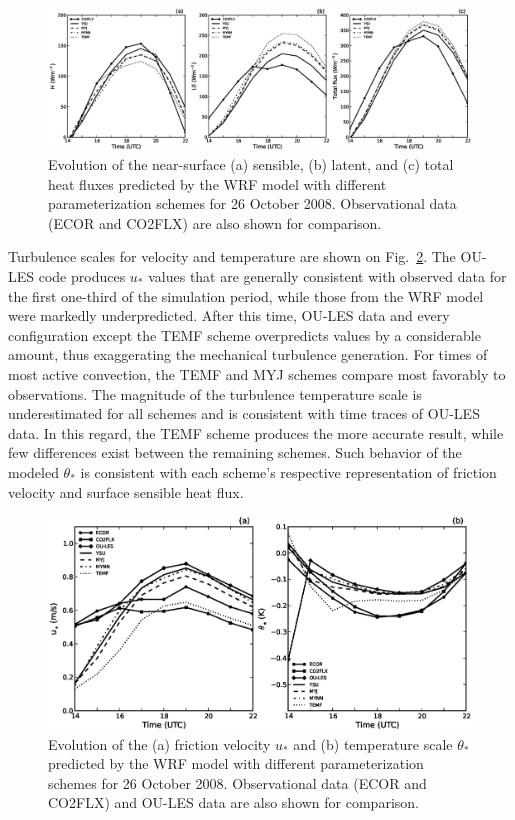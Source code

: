 \begin{figure}[ht!]
\begin{center}
\includegraphics[width=\textwidth]{figures/chapter4/shf_lhf_phys_20081026}
\end{center}
\caption{Evolution of the near-surface (a) sensible, (b) latent, and (c) total heat fluxes predicted by the WRF model with different parameterization schemes for 26 October 2008. Observational data (ECOR and CO2FLX) are also shown for comparison.}
\label{figure423}
\end{figure}


Turbulence scales for velocity and temperature are shown on Fig.~\ref{figure424}. The OU-LES code produces $u_*$ values that are generally consistent with observed data for the first one-third of the simulation period, while those from the WRF model were markedly underpredicted. After this time, OU-LES data and every configuration except the TEMF scheme overpredicts values by a considerable amount, thus exaggerating the mechanical turbulence generation. For times of most active convection, the TEMF and MYJ schemes compare most favorably to observations. The magnitude of the turbulence temperature scale is underestimated for all schemes and is consistent with time traces of OU-LES data. In this regard, the TEMF scheme produces the more accurate result, while few differences exist between the remaining schemes. Such behavior of the modeled $\theta_*$ is consistent with each scheme's respective representation of friction velocity and surface sensible heat flux.


\begin{figure}[ht!]
\begin{center}
\includegraphics[width=\textwidth]{figures/chapter4/ust_tst_phys_20081026}
\end{center}
\caption{Evolution of the (a) friction velocity $u_*$ and (b) temperature scale $\theta_*$ predicted by the WRF model with different parameterization schemes for 26 October 2008. Observational data (ECOR and CO2FLX) and OU-LES data are also shown for comparison.}
\label{figure424}
\end{figure}


